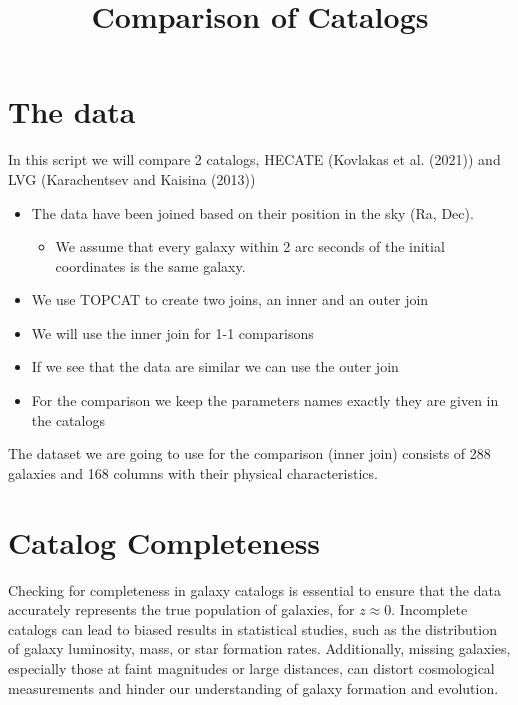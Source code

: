 \documentclass[
]{article}
\title{Comparison of Catalogs}
\author{}
\date{}
\providecommand{\tightlist}{%
  \setlength{\itemsep}{0pt}\setlength{\parskip}{0pt}}\usepackage{longtable,booktabs,array}
\renewcommand*\contentsname{Table of contents}
\newcommand\contentsname{Table of contents}
\begin{document}
\maketitle

\renewcommand*\contentsname{Table of contents}
{
\hypersetup{linkcolor=}
\setcounter{tocdepth}{3}
\tableofcontents
}
\section{The data}\label{the-data}

In this script we will compare 2 catalogs, HECATE (Kovlakas et al.
(2021)) and LVG (Karachentsev and Kaisina (2013))

\begin{itemize}
\tightlist
\item
  The data have been joined based on their position in the sky (Ra,
  Dec).

  \begin{itemize}
  \tightlist
  \item
    We assume that every galaxy within 2 arc seconds of the initial
    coordinates is the same galaxy.
  \end{itemize}
\item
  We use TOPCAT to create two joins, an inner and an outer join
\item
  We will use the inner join for 1-1 comparisons
\item
  If we see that the data are similar we can use the outer join
\item
  For the comparison we keep the parameters names exactly they are given
  in the catalogs
\end{itemize}

The dataset we are going to use for the comparison (inner join) consists
of 288 galaxies and 168 columns with their physical characteristics.

\section{Catalog Completeness}\label{catalog-completeness}

Checking for completeness in galaxy catalogs is essential to ensure that
the data accurately represents the true population of galaxies, for
\(z \approx 0\). Incomplete catalogs can lead to biased results in
statistical studies, such as the distribution of galaxy luminosity,
mass, or star formation rates. Additionally, missing galaxies,
especially those at faint magnitudes or large distances, can distort
cosmological measurements and hinder our understanding of galaxy
formation and evolution.
\end{document}
